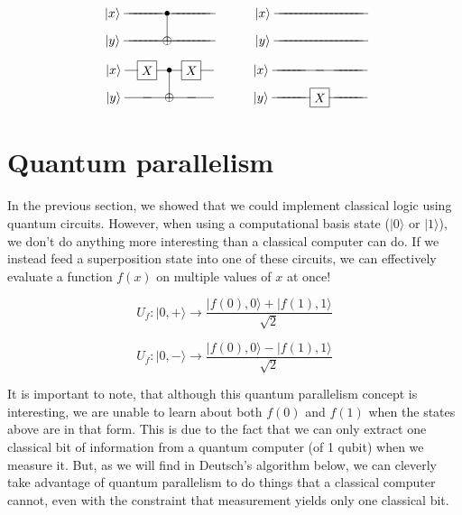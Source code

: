 \documentclass[12pt, letterpaper]{article}
\makeatletter
\def\w{\ar@{-}[l]}
\def\A#1{\save []="#1" \restore}
\def\op#1{*+[F]{\rule[-0.2ex]{0ex}{2.1ex}#1}}	%
\def\b{*={\bullet}}
\def\o{*={\oplus}}
\def\n{*-{}\w}
\def\>{\rangle}
\def\q#1{*+{\rule[-0.2ex]{0ex}{2.1ex}|#1\>}}
\makeatother
\begin{document}
\def\gAxA{\op{X}\w\A{gAxA}}
\def\gBxA{\b\w\A{gBxA}}
\def\gBxB{\o\w\A{gBxB}}
\def\gCxA{\op{X}\w\A{gCxA}}
\def\bA{ \q{x}}
\def\bB{ \q{y}}
$$\xymatrix@R=5pt@C=10pt{
    \bA &\n &\n &\n &\n &\n &\n &\gBxA &\n &\n &\n &\n &\n &\n &\n &\n
\\  \bB &\n &\n &\n &\n &\n &\n &\gBxB &\n &\n &\n &\n &\n &\n &\n &\n
\ar@{-}"gBxB";"gBxA"
}\hspace{1 cm}
\xymatrix@R=5pt@C=10pt{
    \bA &\n &\n &\n &\n &\n &\n &\n &\n &\n &\n &\n &\n &\n &\n &\n &\n &\n
\\  \bB &\n &\n &\n &\n &\n &\n &\n &\n &\n &\n &\n &\n &\n &\n &\n &\n &\n
}$$
$$\xymatrix@R=5pt@C=10pt{
    \bA &\gAxA &\gBxA &\gCxA &\n
\\  \bB &\n &\gBxB &\n &\n
\ar@{-}"gBxB";"gBxA"
}\hspace{1 cm}
\xymatrix@R=5pt@C=10pt{
    \bA &\n &\n &\n &\n &\n &\n &\n &\n &\n &\n &\n &\n
\\  \bB &\n &\n &\n &\n &\n &\gAxA &\n &\n &\n &\n &\n &\n
}$$

\section{Quantum parallelism}

In the previous section, we showed that we could implement classical logic using quantum circuits. However, when using a computational basis state ($|0\rangle$ or $|1\rangle$), we don't do anything more interesting than a classical computer can do. If we instead feed a superposition state into one of these circuits, we can effectively evaluate a function $f(x)$ on multiple values of $x$ at once!

\begin{equation}
U_f : |0,+\rangle \rightarrow \dfrac{|f(0), 0\rangle + |f(1), 1\rangle}{\sqrt{2}}
\end{equation}
\vspace{1 mm}

\begin{equation}
U_f : |0,-\rangle \rightarrow \dfrac{|f(0), 0\rangle - |f(1), 1\rangle}{\sqrt{2}}
\end{equation}
\vspace{1 mm}

\noindent
It is important to note, that although this quantum parallelism concept is interesting, we are unable to learn about both $f(0)$ and $f(1)$ when the states above are in that form. This is due to the fact that we can only extract one classical bit of information from a quantum computer (of 1 qubit) when we measure it. But, as we will find in Deutsch's algorithm below, we can cleverly take advantage of quantum parallelism to do things that a classical computer cannot, even with the constraint that measurement yields only one classical bit.
\end{document}
